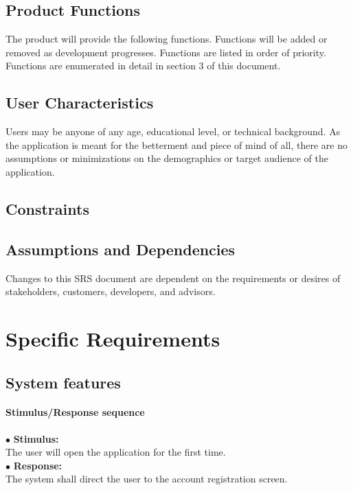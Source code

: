 \documentclass{scrreprt}
\begin{document}
\section{Product Functions}
The product will provide the following functions. Functions will be added or removed as 
development progresses. Functions are listed in order of priority. Functions are enumerated in detail in section 3 of this document.


\section{User Characteristics}
Users may be anyone of any age, educational level, or technical background. As the application is meant for the betterment and piece of mind of all, there are no assumptions or minimizations on the demographics or target audience of the application.


\section{Constraints}


\section{Assumptions and Dependencies}
Changes to this SRS document are dependent on the requirements or desires of stakeholders, customers, developers, and advisors. 


\chapter{Specific Requirements}

\section{System features}


\subsubsection{Stimulus/Response sequence}
\vspace{5mm}
	$\bullet$ \textbf{Stimulus:} \\ \hspace{5mm} The user will open the application for the first time.\\
	$\bullet$ \textbf{Response:} \\ \hspace{5mm} The system shall direct the user to the account registration screen.
\end{document}
